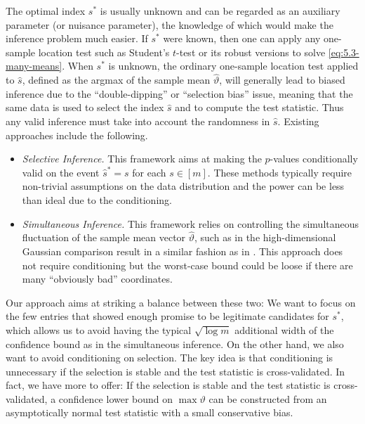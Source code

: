 \documentclass[11pt]{article}
\theoremstyle{plain}
\begin{document}
The optimal index $s^*$ is usually unknown and can be regarded as an auxiliary parameter (or nuisance parameter), the knowledge of which would make the inference problem much easier.  If $s^*$ were known, then one can apply any one-sample location test such as Student's $t$-test or its robust versions to solve \eqref{eq:5.3-many-means}.  When $s^*$ is unknown, the ordinary one-sample location test applied to $\hat s$, defined as the argmax of the sample mean $\hat\vartheta$, will generally lead to biased inference due to the ``double-dipping'' or ``selection bias'' issue, meaning that the same data is used to select the index $\hat s$ and to compute the test statistic. Thus any valid inference must take into account the randomness in $\hat s$. Existing approaches include the following.
\begin{itemize}
    \item \emph{Selective Inference.}  This framework aims at making the $p$-values conditionally valid on the event $\hat s^*=s$ for each $s\in[m]$. These methods typically require non-trivial assumptions on the data distribution and the power can be less than ideal due to the conditioning. 
    \item \emph{Simultaneous Inference.}  This framework relies on controlling the simultaneous fluctuation of the sample mean vector $\hat\vartheta$, such as in the high-dimensional Gaussian comparison result in a similar fashion as in .  This approach does not require conditioning but the worst-case bound could be loose if there are many ``obviously bad'' coordinates.
\end{itemize}

Our approach aims at striking a balance between these two: We want to focus on the few entries that showed enough promise to be legitimate candidates for $s^*$, which allows us to avoid having the typical $\sqrt{\log m}$ additional width of the confidence bound as in the simultaneous inference. On the other hand, we also want to avoid conditioning on selection.  The key idea is that conditioning is unnecessary if the selection is stable and
    the test statistic is cross-validated.
In fact, we have more to offer: If the selection is stable and the test statistic is cross-validated, a confidence lower bound on $\max\vartheta$ can be constructed from an asymptotically normal test statistic with a small conservative bias.
\end{document}
